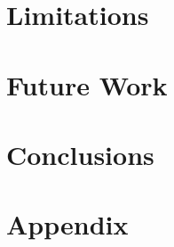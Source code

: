 \documentclass[a4paper, 14pt]{article}
\begin{document}
\section{Limitations}

\section{Future Work}

\section{Conclusions}

\newpage
\section{Appendix}
\end{document}
